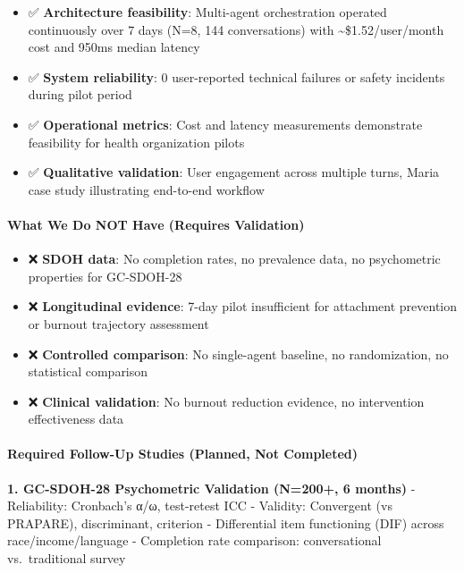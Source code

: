\documentclass[
]{article}
\providecommand{\tightlist}{%
  \setlength{\itemsep}{0pt}\setlength{\parskip}{0pt}}
\begin{document}
\begin{itemize}
\tightlist
\item
  ✅ \textbf{Architecture feasibility}: Multi-agent orchestration
  operated continuously over 7 days (N=8, 144 conversations) with
  \textasciitilde\$1.52/user/month cost and 950ms median latency
\item
  ✅ \textbf{System reliability}: 0 user-reported technical failures or
  safety incidents during pilot period
\item
  ✅ \textbf{Operational metrics}: Cost and latency measurements
  demonstrate feasibility for health organization pilots
\item
  ✅ \textbf{Qualitative validation}: User engagement across multiple
  turns, Maria case study illustrating end-to-end workflow
\end{itemize}

\paragraph{What We Do NOT Have (Requires
Validation)}\label{what-we-do-not-have-requires-validation}

\begin{itemize}
\tightlist
\item
  ❌ \textbf{SDOH data}: No completion rates, no prevalence data, no
  psychometric properties for GC-SDOH-28
\item
  ❌ \textbf{Longitudinal evidence}: 7-day pilot insufficient for
  attachment prevention or burnout trajectory assessment
\item
  ❌ \textbf{Controlled comparison}: No single-agent baseline, no
  randomization, no statistical comparison
\item
  ❌ \textbf{Clinical validation}: No burnout reduction evidence, no
  intervention effectiveness data
\end{itemize}

\paragraph{Required Follow-Up Studies (Planned, Not
Completed)}\label{required-follow-up-studies-planned-not-completed}

\textbf{1. GC-SDOH-28 Psychometric Validation (N=200+, 6 months)} -
Reliability: Cronbach's α/ω, test-retest ICC - Validity: Convergent (vs
PRAPARE), discriminant, criterion - Differential item functioning (DIF)
across race/income/language - Completion rate comparison: conversational
vs.~traditional survey
\end{document}
